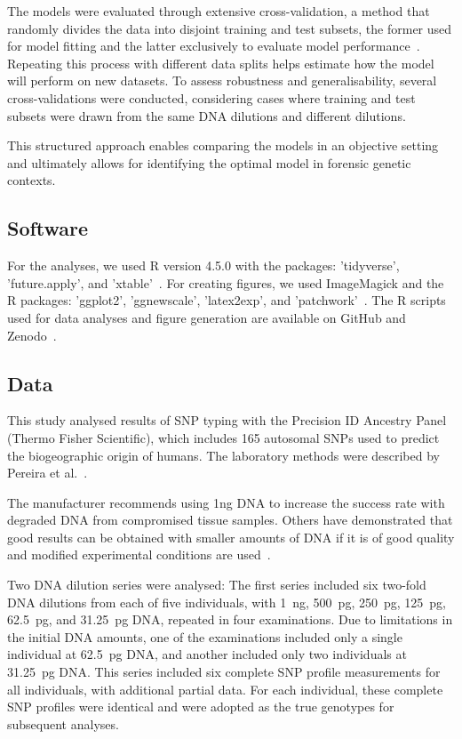 \documentclass[preprint,5p,times,11pt]{elsarticle}
\begin{document}
The models were evaluated through extensive cross-validation, a method that randomly divides the data into disjoint training and test subsets, the former used for model fitting and the latter exclusively to evaluate model performance~\cite{stone, picard}.
Repeating this process with different data splits helps estimate how the model will perform on new datasets.
To assess robustness and generalisability, several cross-validations were conducted, considering cases where training and test subsets were drawn from the same DNA dilutions and different dilutions.

This structured approach enables comparing the models in an objective setting and ultimately allows for identifying the optimal model in forensic genetic contexts.


\subsection{Software}
For the analyses, we used R version 4.5.0 with the packages: 'tidyverse', 'future.apply', and 'xtable'~\cite{r, tidyverse1, tidyverse2, future1, future2, futureapply, xtable}.
For creating figures, we used ImageMagick and the R packages: 'ggplot2', 'ggnewscale', 'latex2exp', and 'patchwork'~\cite{imagemagick, ggplot, ggnewscale, latex2exp, patchwork}.
The R scripts used for data analyses and figure generation are available on GitHub and Zenodo~\cite{scripts}.


\subsection{Data}
This study analysed results of SNP typing with the Precision ID Ancestry Panel (Thermo Fisher Scientific), which includes 165 autosomal SNPs used to predict the biogeographic origin of humans.
The laboratory methods were described by Pereira et al.~\cite{pereira}.

The manufacturer recommends using 1ng DNA to increase the success rate with degraded DNA from compromised tissue samples.
Others have demonstrated that good results can be obtained with smaller amounts of DNA if it is of good quality and modified experimental conditions are used~\cite{alasfi}.

Two DNA dilution series were analysed:
The first series included six two-fold DNA dilutions from each of five individuals, with \SI{1}{\ng}, \SI{500}{\pg}, \SI{250}{\pg}, \SI{125}{\pg}, \SI{62.5}{\pg}, and \SI{31.25}{\pg} DNA, repeated in four examinations.
Due to limitations in the initial DNA amounts, one of the examinations included only a single individual at \SI{62.5}{\pg} DNA, and another included only two individuals at \SI{31.25}{\pg} DNA.
This series included six complete SNP profile measurements for all individuals, with additional partial data.
For each individual, these complete SNP profiles were identical and were adopted as the true genotypes for subsequent analyses.
\end{document}
